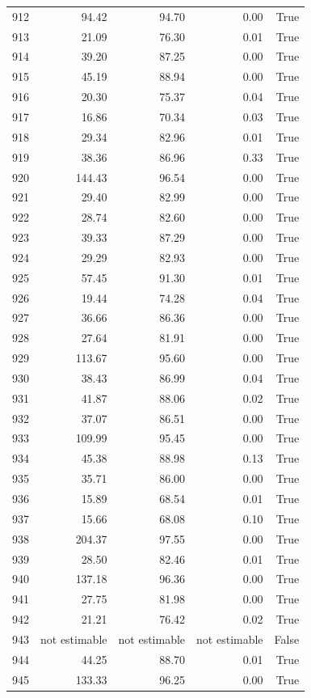 \begin{longtable}{rrrrr}
912 & 94.42 & 94.70 & 0.00 & True \\
913 & 21.09 & 76.30 & 0.01 & True \\
914 & 39.20 & 87.25 & 0.00 & True \\
915 & 45.19 & 88.94 & 0.00 & True \\
916 & 20.30 & 75.37 & 0.04 & True \\
917 & 16.86 & 70.34 & 0.03 & True \\
918 & 29.34 & 82.96 & 0.01 & True \\
919 & 38.36 & 86.96 & 0.33 & True \\
920 & 144.43 & 96.54 & 0.00 & True \\
921 & 29.40 & 82.99 & 0.00 & True \\
922 & 28.74 & 82.60 & 0.00 & True \\
923 & 39.33 & 87.29 & 0.00 & True \\
924 & 29.29 & 82.93 & 0.00 & True \\
925 & 57.45 & 91.30 & 0.01 & True \\
926 & 19.44 & 74.28 & 0.04 & True \\
927 & 36.66 & 86.36 & 0.00 & True \\
928 & 27.64 & 81.91 & 0.00 & True \\
929 & 113.67 & 95.60 & 0.00 & True \\
930 & 38.43 & 86.99 & 0.04 & True \\
931 & 41.87 & 88.06 & 0.02 & True \\
932 & 37.07 & 86.51 & 0.00 & True \\
933 & 109.99 & 95.45 & 0.00 & True \\
934 & 45.38 & 88.98 & 0.13 & True \\
935 & 35.71 & 86.00 & 0.00 & True \\
936 & 15.89 & 68.54 & 0.01 & True \\
937 & 15.66 & 68.08 & 0.10 & True \\
938 & 204.37 & 97.55 & 0.00 & True \\
939 & 28.50 & 82.46 & 0.01 & True \\
940 & 137.18 & 96.36 & 0.00 & True \\
941 & 27.75 & 81.98 & 0.00 & True \\
942 & 21.21 & 76.42 & 0.02 & True \\
943 & not estimable & not estimable & not estimable & False \\
944 & 44.25 & 88.70 & 0.01 & True \\
945 & 133.33 & 96.25 & 0.00 & True \\

\end{longtable}
